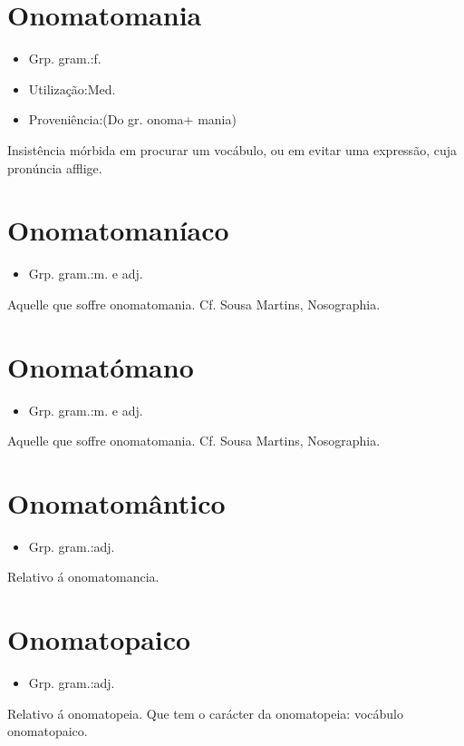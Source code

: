 \section{Onomatomania}
\begin{itemize}
\item {Grp. gram.:f.}
\end{itemize}
\begin{itemize}
\item {Utilização:Med.}
\end{itemize}
\begin{itemize}
\item {Proveniência:(Do gr. \textunderscore onoma\textunderscore  + \textunderscore mania\textunderscore )}
\end{itemize}
Insistência mórbida em procurar um vocábulo, ou em evitar uma expressão, cuja pronúncia afflige.
\section{Onomatomaníaco}
\begin{itemize}
\item {Grp. gram.:m.  e  adj.}
\end{itemize}
Aquelle que soffre onomatomania. Cf. Sousa Martins, \textunderscore Nosographia\textunderscore .
\section{Onomatómano}
\begin{itemize}
\item {Grp. gram.:m.  e  adj.}
\end{itemize}
Aquelle que soffre onomatomania. Cf. Sousa Martins, \textunderscore Nosographia\textunderscore .
\section{Onomatomântico}
\begin{itemize}
\item {Grp. gram.:adj.}
\end{itemize}
Relativo á onomatomancia.
\section{Onomatopaico}
\begin{itemize}
\item {Grp. gram.:adj.}
\end{itemize}
Relativo á onomatopeia.
Que tem o carácter da onomatopeia: \textunderscore vocábulo onomatopaico\textunderscore .
